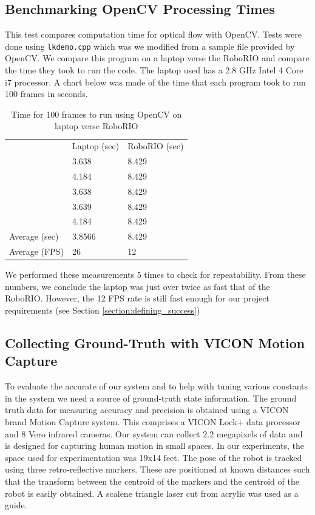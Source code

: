 \documentclass{article}
\begin{document}
  \subsection{Benchmarking OpenCV Processing Times}

    This test compares computation time for optical flow with OpenCV. Tests were done using \texttt{lkdemo.cpp} which was we modified from a sample file provided by OpenCV. We compare this program on a laptop verse the RoboRIO and compare the time they took to run the code. The laptop used has a 2.8 GHz Intel 4 Core i7 processor. A chart below was made of the time that each program took to run 100 frames in seconds.

    \begin{table}[H]
      \centering
      \begin{tabular}{l|l|l|}
        \cline{2-3}
        & Laptop (sec) & RoboRIO (sec) \\
        \cline{2-3}
        & 3.638 & 8.429 \\
        & 4.184 & 8.429\\
        & 3.638 & 8.429 \\
        & 3.639 & 8.429 \\
        & 4.184 & 8.429 \\
        \hline
        \multicolumn{1}{|l|}{Average (sec)} & 3.8566 & 8.429 \\
        \multicolumn{1}{|l|}{Average (FPS)} & 26 & 12 \\
        \hline
      \end{tabular}
      \caption{Time for 100 frames to run using OpenCV on laptop verse RoboRIO}
      \label{table:optical_flow_benchmark}
    \end{table}

    We performed these measurements 5 times to check for repeatability. From these numbers, we conclude the laptop was just over twice as fast that of the RoboRIO. However, the 12 FPS rate is still fast enough for our project requirements (see Section \ref{section:defining_success})

  \subsection{Collecting Ground-Truth with VICON Motion Capture}

    To evaluate the accurate of our system and to help with tuning various constants in the system we need a source of ground-truth state information. The ground truth data for measuring accuracy and precision is obtained using a VICON brand Motion Capture system. This comprises a VICON Lock+ data processor and 8 Vero infrared cameras. Our system can collect 2.2 megapixels of data and is designed for capturing human motion in small spaces. In our experiments, the space used for experimentation was 19x14 feet. The pose of the robot is tracked using three retro-reflective markers. These are positioned at known distances such that the transform between the centroid of the markers and the centroid of the robot is easily obtained. A scalene triangle laser cut from acrylic was used as a guide.
\end{document}
